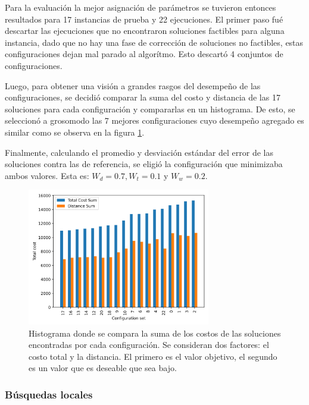 \documentclass{article}
\begin{document}
  Para la evaluación la mejor asignación de parámetros se tuvieron entonces resultados para 17 instancias de prueba y 22 ejecuciones. El primer paso fué descartar las ejecuciones que no encontraron soluciones factibles para alguna instancia, dado que no hay una fase de corrección de soluciones no factibles, estas configuraciones dejan mal parado al algorítmo. Esto descartó 4 conjuntos de configuraciones.

  Luego, para obtener una visión a grandes rasgos del desempeño de las configuraciones, se decidió comparar la suma del costo y distancia de las 17 soluciones para cada configuración y compararlas en un histograma. De esto, se seleccionó a grosomodo las 7 mejores configuraciones cuyo desempeño agregado es similar como se observa en la figura \ref{cmphistogram}.

  Finalmente, calculando el promedio y desviación estándar del error de las soluciones contra las de referencia, se eligió la configuración que minimizaba ambos valores. Esta es: $W_d = 0.7, W_t = 0.1$ y $W_w = 0.2$.

  \begin{figure}[h!]
    \centering
    \includegraphics[width=8cm]{resources/tunning/total_cost_histogram_used.png}
    \caption{Histograma donde se compara la suma de los costos de las soluciones encontradas por cada configuración. Se consideran dos factores: el costo total y la distancia. El primero es el valor objetivo, el segundo es un valor que es deseable que sea bajo.}
    \label{cmphistogram}
  \end{figure}

  \subsubsection*{Búsquedas locales}
\end{document}
